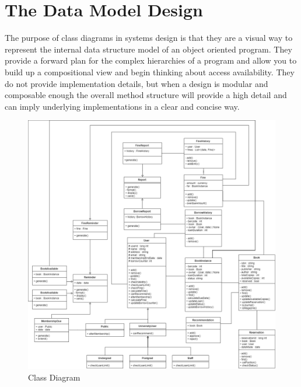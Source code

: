 \section{The Data Model Design}

The purpose of class diagrams in systems design is that they are a visual way to represent the internal data structure model of an object oriented program. They provide a forward plan for the complex hierarchies of a program and allow you to build up a compositional view and begin thinking about access availability\cite{fowleruml}. They do not provide implementation details, but when a design is modular and composable enough the overall method structure will provide a high detail and can imply underlying implementations in a clear and concise way.

\begin{figure}[H]
    \centering
    \includegraphics[width=\linewidth]{image/class.png}
    \caption{Class Diagram}
    \label{fig:class}
\end{figure}

